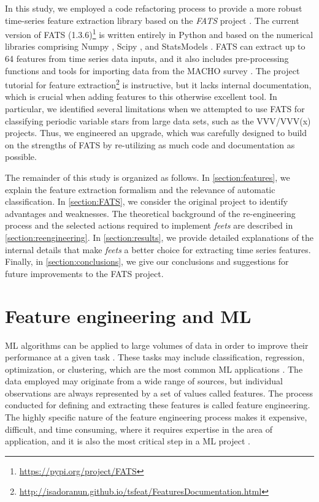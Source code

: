 \documentclass[final,5p,times,twocolumn,authoryear]{elsarticle}
\begin{document}
In this study, we employed a code refactoring process to 
provide a more robust time-series feature extraction library based on 
the \textit{FATS} project \citep{nun2015fats}. 
%
The current version of FATS (1.3.6)\footnote{\url{https://pypi.org/project/FATS}}
is written entirely in Python and 
based on the numerical libraries comprising Numpy \citep{walt_numpy_2011}, 
Scipy \citep{jones_scipy:_2014}, and StatsModels \citep{seabold_statsmodels:_2010}.
FATS can extract up to 64 features from time series data inputs,
and it also includes pre-processing functions and tools for importing data from
the MACHO survey \citep{cook_variable_1995}. 
%
The project tutorial for feature extraction\footnote{\url{http://isadoranun.github.io/tsfeat/FeaturesDocumentation.html}} is instructive,
but it lacks internal documentation, which is crucial when adding features to this otherwise excellent tool.
%
In particular, we identified several limitations
when we attempted to use FATS for classifying periodic variable 
stars from large data sets, such as the VVV/VVV(x) \citep{catelan_vista_2011, minniti_mapping_2018} 
projects.
%
Thus, we engineered an upgrade, which was carefully designed to build on the strengths of FATS by re-utilizing as much code 
and documentation as possible.

The remainder of this study is organized as follows.
In \autoref{section:features}, we explain the feature extraction formalism and the
relevance of automatic classification. In
\autoref{section:FATS}, we consider the original project to identify 
advantages and weaknesses. 
%
The theoretical background of the re-engineering process
and the selected actions required to implement \textit{feets} are described in 
\autoref{section:reengineering}. In \autoref{section:results}, we provide 
detailed explanations of the internal details that make 
\textit{feets} a better choice for extracting time series features.
%
Finally, in \autoref{section:conclusions}, we give our conclusions and 
suggestions for future improvements to the FATS project.

\section{Feature engineering and ML}
\label{section:features}
%
ML algorithms can be applied to large 
volumes of data in order to improve their performance at a given task \citep{samuel_studies_1959}.
%
These tasks may include classification, regression, optimization, or clustering, which are
the most common ML applications \citep{michalski_machine_2013}.
%
The data employed may originate from a wide range of sources, but 
individual observations are always represented by a set of values called features.
The process conducted for defining and extracting these features is called 
feature engineering. 
The highly specific nature of the feature engineering process makes it expensive, difficult, 
and time consuming, where it requires expertise in the area of application, and it is 
also the most critical step in a 
ML project \citep{ng_machine_2013}.
\end{document}
